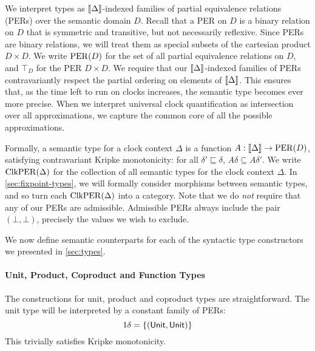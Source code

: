 We interpret types as $\llbracket \Delta \rrbracket$-indexed families of partial
equivalence relations (PERs) over the semantic domain $D$. Recall that
a PER on $D$ is a binary relation on $D$ that is symmetric and
transitive, but not necessarily reflexive. Since PERs are binary
relations, we will treat them as special subsets of the cartesian
product $D \times D$. We write $\mathrm{PER}(D)$ for the set of all partial
equivalence relations on $D$, and $\top_D$ for the PER $D \times D$.
We require that our $\llbracket \Delta \rrbracket$-indexed families of PERs
contravariantly respect the partial ordering on elements of
$\llbracket \Delta \rrbracket$. This ensures that, as the time left to run on clocks
increases, the semantic type becomes ever more precise. When we
interpret universal clock quantification as intersection over all
approximations, we capture the common core of all the possible
approximations.

Formally, a semantic type for a clock context $\Delta$ is a function
$A : \llbracket \Delta \rrbracket \to \mathrm{PER}(D)$, satisfying contravariant Kripke
monotonicity: for all $\delta' \sqsubseteq \delta$, $A\delta \subseteq
A\delta'$. We write $\mathrm{ClkPER}(\Delta)$ for the collection of all
semantic types for the clock context $\Delta$. In
\autoref{sec:fixpoint-types}, we will formally consider morphisms
between semantic types, and so turn each $\mathrm{ClkPER}(\Delta)$ into a
category. Note that we do \emph{not} require that any of our PERs are
admissible. Admissible PERs always include the pair $(\bot,\bot)$,
precisely the values we wish to exclude.

We now define semantic counterparts for each of the syntactic type
constructors we presented in \autoref{sec:types}.

\paragraph{Unit, Product, Coproduct and Function Types}

The constructions for unit, product and coproduct types are
straightforward. The unit type will be interpreted by a constant
family of PERs:
\begin{displaymath}
  1\delta = \{(\mathsf{Unit}, \mathsf{Unit})\}
\end{displaymath}
This trivially satisfies Kripke monotonicity.

